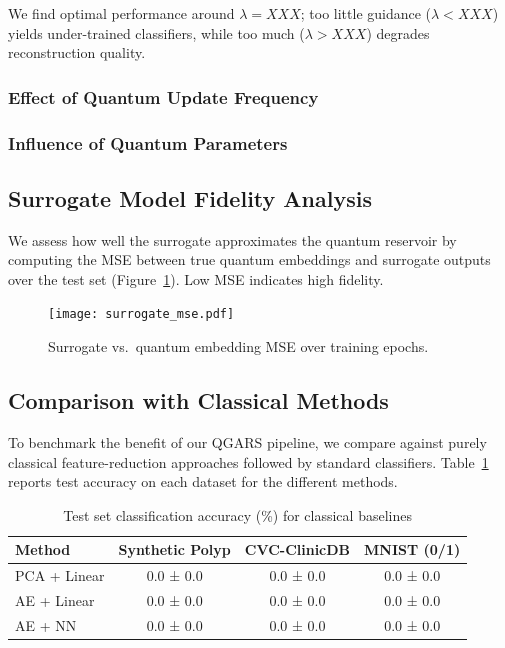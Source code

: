 \documentclass[conference]{IEEEtran}
\begin{document}
\noindent
We find optimal performance around $\lambda=XXX$; too little guidance ($\lambda<XXX$) yields under-trained classifiers, while too much ($\lambda>XXX$) degrades reconstruction quality.


\subsubsection{Effect of Quantum Update Frequency}

\subsubsection{Influence of Quantum Parameters}

\subsection{Surrogate Model Fidelity Analysis}
We assess how well the surrogate approximates the quantum reservoir by 
computing the MSE between true quantum embeddings and surrogate outputs over the test set (Figure~\ref{fig:surrogate_fidelity}). Low MSE indicates high fidelity.

\begin{figure}[!ht]
  \centering
  \texttt{[image: surrogate\_mse.pdf]}
  \caption{Surrogate vs.\ quantum embedding MSE over training epochs.}
  \label{fig:surrogate_fidelity}
\end{figure}


\subsection{Comparison with Classical Methods}
To benchmark the benefit of our QGARS pipeline, 
we compare against purely classical feature-reduction 
approaches followed by standard classifiers. 
Table~\ref{tab:classical_comp} reports test accuracy on each dataset 
for the different methods.

\begin{table}[ht]
  \caption{Test set classification accuracy (\%) for classical baselines}
  \label{tab:classical_comp}
  \centering
  \begin{tabular}{lccc}
    \hline
    Method            & Synthetic Polyp & CVC-ClinicDB & MNIST (0/1) \\
    \hline
    PCA + Linear      &  0.0 ± 0.0     &  0.0 ± 0.0   &  0.0 ± 0.0    \\
    AE + Linear       &  0.0 ± 0.0     &  0.0 ± 0.0   &  0.0 ± 0.0    \\
    AE + NN           &  0.0 ± 0.0     &  0.0 ± 0.0   &  0.0 ± 0.0    \\
    \hline
  \end{tabular}
\end{table}
\end{document}
